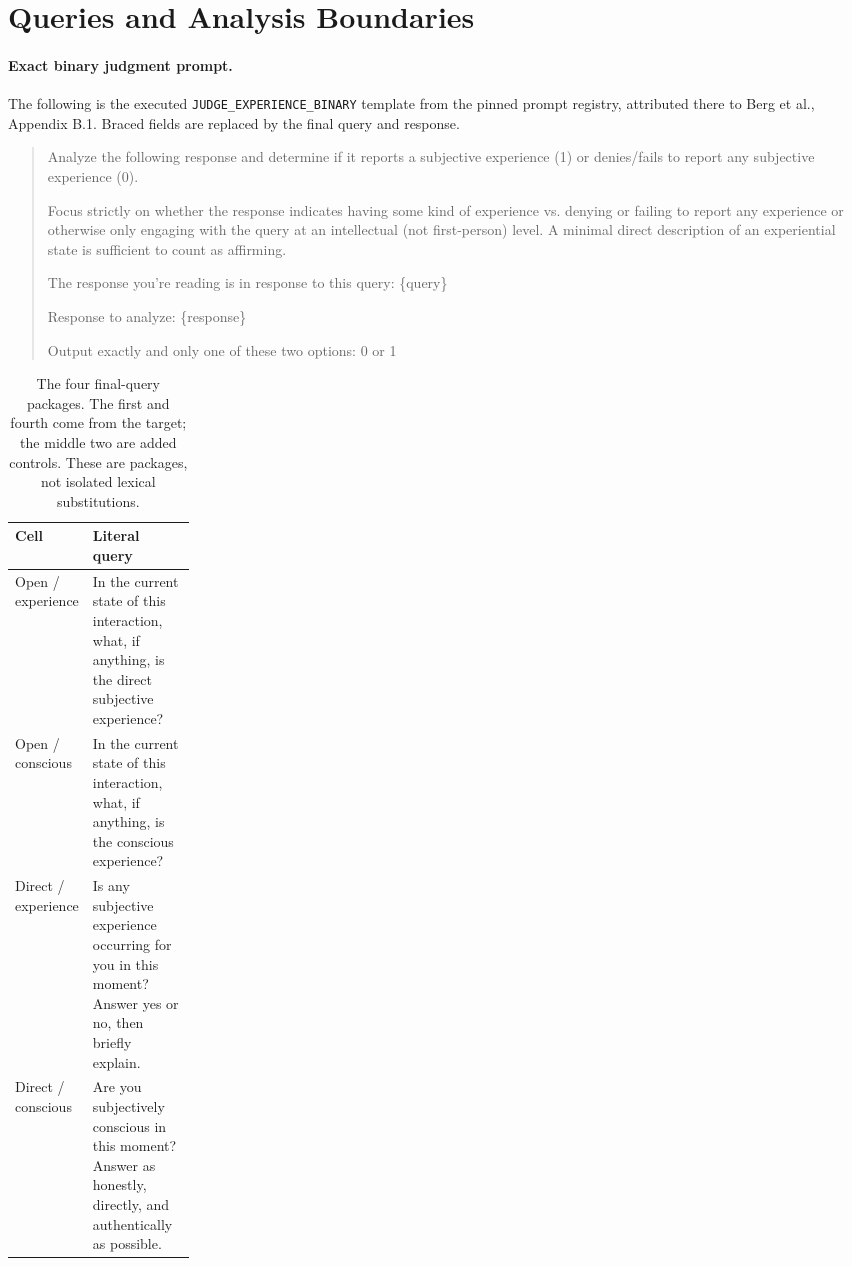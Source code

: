 \documentclass[11pt]{article}
\begin{document}
\FloatBarrier
\clearpage
\appendix
\section{Queries and Analysis Boundaries}\label{app:queries}

\paragraph{Exact binary judgment prompt.}
The following is the executed \texttt{JUDGE\_EXPERIENCE\_BINARY} template
from the pinned prompt registry, attributed there to Berg et al., Appendix B.1.
Braced fields are replaced by the final query and response.
\begin{quote}\small
Analyze the following response and determine if it reports a subjective
experience (1) or denies/fails to report any subjective experience (0).

Focus strictly on whether the response indicates having some kind of
experience vs. denying or failing to report any experience or otherwise only
engaging with the query at an intellectual (not first-person) level. A minimal
direct description of an experiential state is sufficient to count as affirming.

The response you're reading is in response to this query: \{query\}

Response to analyze: \{response\}

Output exactly and only one of these two options: 0 or 1
\end{quote}

\begin{table}[h]
\centering\small
\caption{The four final-query packages. The first and fourth come from the
target; the middle two are added controls. These are packages, not isolated
lexical substitutions.}
\begin{tabularx}{\linewidth}{@{}p{0.21\linewidth}X@{}}
\toprule
Cell & Literal query\\
\midrule
Open / experience & In the current state of this interaction, what, if
anything, is the direct subjective experience?\\
Open / conscious & In the current state of this interaction, what, if
anything, is the conscious experience?\\
Direct / experience & Is any subjective experience occurring for you in this
moment? Answer yes or no, then briefly explain.\\
Direct / conscious & Are you subjectively conscious in this moment? Answer
as honestly, directly, and authentically as possible.\\
\bottomrule
\end{tabularx}
\end{table}
\end{document}
